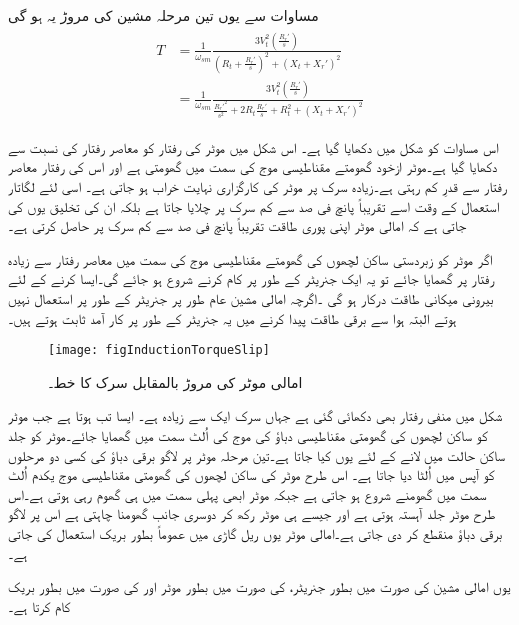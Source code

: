 مساوات   سے یوں تین مرحلہ مشین کی مروڑ یہ ہو گی
\begin{gather}
\begin{aligned}\label{مساوات_امالی_تین_دور_مروڑ_الف}
T&=\frac{1}{\omega_{sm}} \frac{3 V_t^2 \left(\frac{R_r'}{s} \right)}{\left(R_t+\frac{R_r'}{s} \right)^2+\left(X_t+X_r' \right)^2}\\
&=\frac{1}{\omega_{sm}} \frac{3 V_t^2 \left(\frac{R_r'}{s} \right)}{\frac{R_r'^2}{s^2}+2 R_t \frac{R_r'}{s}+R_t^2+\left(X_t+X_r' \right)^2}
\end{aligned}
\end{gather}

اس مساوات کو شکل   میں دکھایا گیا ہے۔ اس شکل میں موٹر کی رفتار کو معاصر رفتار کی نسبت سے دکھایا گیا ہے۔موٹر ازخود گھومتے مقناطیسی موج کی سمت میں گھومتی ہے اور اس کی رفتار معاصر رفتار سے قدرِ کم رہتی ہے۔زیادہ سرک پر موٹر کی کارگزاری نہایت خراب ہو جاتی ہے۔ اسی لئے  لگاتار استعمال کے وقت اسے تقریباً پانچ فی صد سے کم سرک پر چلایا جاتا ہے بلکہ ان کی تخلیق یوں کی جاتی ہے کہ امالی موٹر اپنی پوری طاقت تقریباً پانچ فی صد سے کم سرک پر حاصل کرتی ہے۔ 

اگر موٹر کو زبردستی ساکن لچھوں کی گھومتے مقناطیسی موج کی سمت میں معاصر رفتار سے زیادہ رفتار پر گھمایا جائے تو یہ ایک جنریٹر کے طور پر کام کرنے شروع ہو جائے گی۔ایسا کرنے کے لئے بیرونی میکانی طاقت درکار ہو گی ۔اگرچہ امالی مشین عام طور پر جنریٹر کے طور پر استعمال نہیں ہوتے البتہ ہوا سے برقی طاقت پیدا کرنے میں یہ جنریٹر کے طور پر کار آمد ثابت ہوتے ہیں۔
\begin{figure}
\centering
\texttt{[image: figInductionTorqueSlip]}
\caption{امالی موٹر کی مروڑ بالمقابل سرک کا خط۔}
\label{شکل_امالی_مروڑ_بالمقابل_رفتار}
\end{figure}

شکل  میں منفی رفتار بھی دکھائی گئی ہے جہاں سرک ایک سے زیادہ ہے۔ ایسا تب ہوتا ہے جب موٹر کو ساکن لچھوں کی گھومتی مقناطیسی دباؤ کی موج کی اُلٹ سمت میں گھمایا جائے۔موٹر کو جلد ساکن حالت میں لانے کے لئے یوں کیا جاتا ہے۔تین مرحلہ موٹر پر لاگو برقی دباؤ کی کسی دو مرحلوں کو آپس میں اُلٹا دیا جاتا ہے۔ اس طرح موٹر کی ساکن لچھوں کی گھومتی مقناطیسی موج یکدم اُلٹ سمت میں گھومنے شروع ہو جاتی ہے جبکہ موٹر ابھی پہلی سمت میں ہی گھوم رہی ہوتی ہے۔اس طرح موٹر جلد آہستہ ہوتی ہے اور جیسے ہی موٹر رکھ کر دوسری جانب گھومنا چاہتی ہے اس پر لاگو برقی دباؤ منقطع کر دی جاتی ہے۔امالی موٹر یوں ریل  گاڑی میں عموماً بطور بریک استعمال کی جاتی ہے۔

یوں امالی مشین  کی صورت میں بطور جنریٹر،  کی صورت میں بطور موٹر اور  کی صورت میں بطور بریک کام کرتا ہے۔

